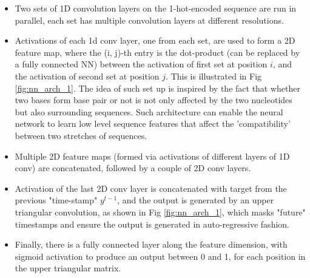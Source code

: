 \documentclass{article}
\begin{document}

%


\begin{itemize}

    \item Two sets of 1D convolution layers on the 1-hot-encoded sequence are run in parallel,
     each set has multiple convolution layers at different resolutions.

    \item Activations of each 1d conv layer, one from each set, are used to form a 2D feature map,
where the (i, j)-th entry is the dot-product (can be replaced by a fully connected NN) between the
activation of first set at position $i$, and the activation of second set at position $j$.
This is illustrated in Fig \ref{fig:nn_arch_1}.
The idea of such set up is inspired by the fact that whether two bases form base pair or not
is not only affected by the two nucleotides but also surrounding sequences.
Such architecture can enable the neural network to learn low level sequence features that affect the 'compatibility'
between two stretches of sequences.

    \item Multiple 2D feature maps (formed via activations of different layers of 1D conv) are concatenated,
followed by a couple of 2D conv layers.



    \item  Activation of the last 2D conv layer is concatenated with target from the previous "time-stamp" $y^{t-1}$,
and the output is generated by an upper triangular convolution, as shown in Fig \ref{fig:nn_arch_1},
which masks "future" timestamps and ensure the output is generated in auto-regressive fashion.

    \item Finally, there is a fully connected layer along the feature dimension,
   with sigmoid activation to produce an output between 0 and 1,
    for each position in the upper triangular matrix.

\end{itemize}
\end{document}
